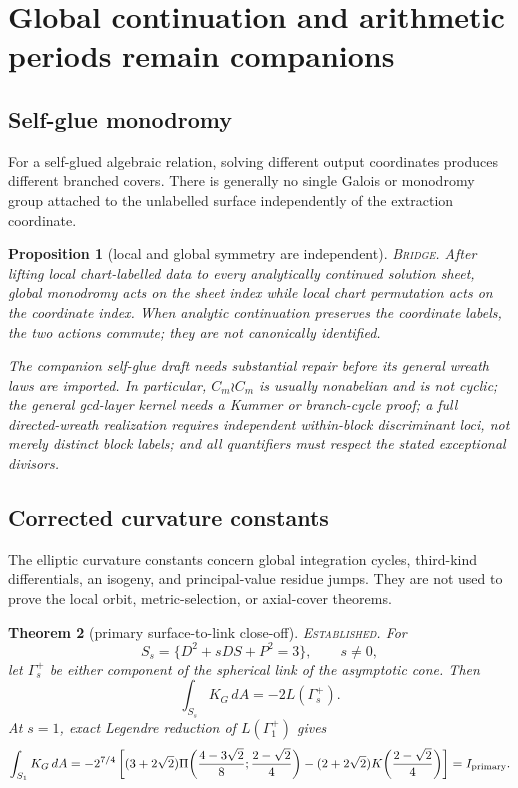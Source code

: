 \documentclass[11pt]{article}
\newtheorem{theorem}{Theorem}[section]
\newtheorem{proposition}[theorem]{Proposition}
\theoremstyle{remark}
\newcommand{\status}[1]{\textup{\textsc{#1}}}
\newcommand{\established}{\status{Established}}
\newcommand{\bridge}{\status{Bridge}}
\newcommand{\proofstop}[1]{\par\medskip\noindent{\color{red!75!black}\textbf{STOP--PROOF.}} \textit{#1}\par\medskip}
\begin{document}
\section{Global continuation and arithmetic periods remain companions}

\subsection{Self-glue monodromy}

For a self-glued algebraic relation, solving different output coordinates produces
different branched covers. There is generally no single Galois or monodromy
group attached to the unlabelled surface independently of the extraction
coordinate.

\begin{proposition}[local and global symmetry are independent]
\bridge.
After lifting local chart-labelled data to every analytically continued
solution sheet, global monodromy acts on the sheet index while local chart
permutation acts on the coordinate index. When analytic continuation preserves
the coordinate labels, the two actions commute; they are not canonically
identified.
\end{proposition}

\proofstop{The companion self-glue draft needs substantial repair before
its general wreath laws are imported. In particular, $C_m\wr C_m$ is
usually nonabelian and is not cyclic; the general gcd-layer kernel needs a
Kummer or branch-cycle proof; a full directed-wreath realization requires independent
within-block discriminant loci, not merely distinct block labels; and all
quantifiers must respect the stated exceptional divisors.}

\subsection{Corrected curvature constants}

The elliptic curvature constants concern global integration cycles,
third-kind differentials, an isogeny, and principal-value residue jumps.
They are not used to prove the local orbit, metric-selection, or axial-cover
theorems.

\begin{theorem}[primary surface-to-link close-off]\label{thm:surface-link}
\established.
For
\[
S_s=\{D^2+sDS+P^2=3\},\qquad s\ne0,
\]
let $\Gamma_s^+$ be either component of the spherical link of the
asymptotic cone. Then
\[
\int_{S_s}K_G\,dA=-2L(\Gamma_s^+).
\]
At $s=1$, exact Legendre reduction of $L(\Gamma_1^+)$ gives
\[
\int_{S_1}K_G\,dA
=-2^{7/4}\left[
(3+2\sqrt2)\Pi\!\left(\frac{4-3\sqrt2}{8};
\frac{2-\sqrt2}{4}\right)
-(2+2\sqrt2)K\!\left(\frac{2-\sqrt2}{4}\right)
\right]
=I_{\rm primary}.
\]
\end{theorem}
\end{document}
